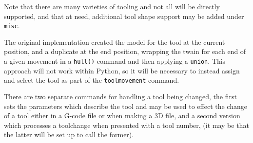 \documentclass{ltxdoc}
\begin{document}

Note that there are many varieties of tooling and not all will be directly supported, and that at need, additional tool shape support may be added under \verb|misc|.
 
The original implementation created the model for the tool at the current position, and a duplicate at the end position, wrapping the twain for each end of a given movement in a \verb|hull()| command and then applying a \verb|union|. This approach will not work within Python, so it will be necessary to instead assign and select the tool as part of the \verb|toolmovement| command.

There are two separate commands for handling a tool being changed, the first sets the parameters which describe the tool and may be used to effect the change of a tool either in a G-code file or when making a 3D file,  and a second version which processes a toolchange when presented with a tool number,  (it may be that the latter will be set up to call the former).
\end{document}

